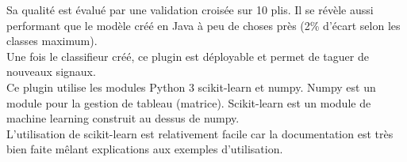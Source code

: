         Sa qualité est évalué par une validation croisée sur 10 plis. Il se révèle aussi performant que le modèle créé en Java à peu de choses près (2\% d'écart selon les classes maximum).\\

        Une fois le classifieur créé, ce plugin est déployable et permet de taguer de nouveaux signaux.\\

        Ce plugin utilise les modules Python 3 scikit-learn et numpy. Numpy est un module pour la gestion de tableau (matrice). Scikit-learn est un module de machine learning construit au dessus de numpy.\\
        L'utilisation de scikit-learn est relativement facile car la documentation est très bien faite mêlant explications aux exemples d'utilisation.
